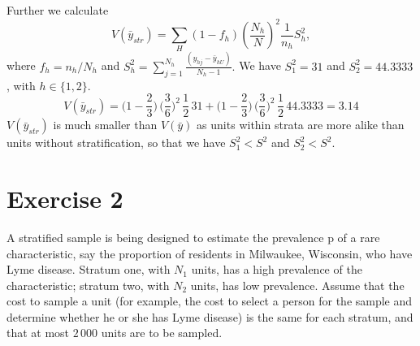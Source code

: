 \documentclass[12pt]{article}
\begin{document}
\begin{enumerate}
{\begin{minipage}[t]{0.97\linewidth}
Further we calculate $$V(\bar{y}_{str})=\sum_{H}(1-f_h)(\frac{N_h}{N})^2 \frac{1}{n_h}S_h^2,$$
where $f_h=n_h/N_h$ and  $S_h^2 = \sum_{j=1}^{N_h}\frac{(y_{hj} - \bar{y}_{hU})}{N_h - 1}.$ 
We have $S_1^2 = 31$ and $S_2^2 = 44.3333$, with $h \in \{1,2\}$.
$$V(\bar{y}_{str})=\Big(1-\frac{2}{3}\Big)\,\Big(\frac{3}{6}\Big)^2\,\frac{1}{2}\, 31 + \Big(1-\frac{2}{3}\Big)\,\Big(\frac{3}{6}\Big)^2\,\frac{1}{2}\, 44.3333=3.14	$$ 
$V(\bar{y}_{str})$ is much smaller than $V(\bar{y})$ as units within strata are more alike than units without stratification, so that we have $S_1^2< S^2$ and $S_2^2<S^2$.
\end{minipage}} 
\end{enumerate}

\section*{Exercise 2}
A stratified sample is being designed to estimate the prevalence p of a rare characteristic,
say the proportion of residents in Milwaukee, Wisconsin, who have Lyme
disease. Stratum one, with $N_1$ units, has a high prevalence of the characteristic; stratum
two, with $N_2$ units, has low prevalence. Assume that the cost to sample a unit (for
example, the cost to select a person for the sample and determine whether he or she
has Lyme disease) is the same for each stratum, and that at most $2\,000$ units are to be
sampled.
\end{document}

